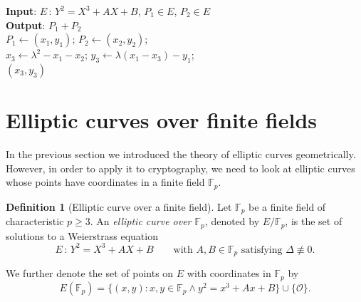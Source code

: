 \documentclass[9pt]{article}
\theoremstyle{definition}
\newtheorem{definition}{Definition}[section]
\begin{document}
\begin{algorithm}[h]
	\SetAlgoLined
	\textbf{Input}: $E \, : \, Y^2 = X^3 + AX + B$, $P_1 \in E$, $P_2 \in E$ \\
	\textbf{Output}: $P_1 + P_2$ \\ 
	$P_1 \gets (x_1, y_1)$; $P_2 \gets (x_2, y_2)$; \\
	$x_3 \gets \lambda^2 - x_1 - x_2$; $y_3 \gets \lambda(x_1 - x_3) - y_1$; \\
	\Return $(x_3, y_3)$
	\caption{Elliptic curve addition algorithm (ECAA)}
	\label{alg:ECAA}
\end{algorithm}

\clearpage\section{Elliptic curves over finite fields}

In the previous section we introduced the theory of elliptic curves geometrically. However, in order to apply it to cryptography, we need to look at elliptic curves whose points have coordinates in a finite field $\mathbb{F}_p$.

\begin{definition}[Elliptic curve over a finite field]
    Let $\mathbb{F}_p$ be a finite field of characteristic $p \geq 3$. An \textit{elliptic curve over $\mathbb{F}_p$}, denoted by $E/\mathbb{F}_p$, is the set of solutions to a Weierstrass equation
	$$E \, : \, Y^2 = X^3 + AX + B \qquad \text{with $A, B \in \mathbb{F}_p$ satisfying $\Delta \not\equiv 0$}.$$
	
	We further denote the set of points on $E$ with coordinates in $\mathbb{F}_p$ by 
	$$E(\mathbb{F}_p) = \{(x, y) : x, y \in \mathbb{F}_p \wedge y^2 = x^3 + Ax + B\} \cup \{\mathcal{O}\}.$$
\end{definition}
\end{document}
